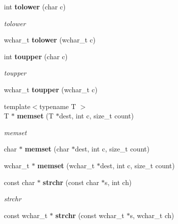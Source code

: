 \begin{DoxyCompactItemize}
\item 
int {\bf tolower} (char c)\label{namespacestring__util_abe4f0e0cc9d5260ee988dd629be5cf33}

\begin{DoxyCompactList}\small\item\em tolower \end{DoxyCompactList}\item 
wchar\+\_\+t {\bfseries tolower} (wchar\+\_\+t c)\label{namespacestring__util_a1a1472adfdc7d01583d9608ac28ffe43}

\item 
int {\bf toupper} (char c)\label{namespacestring__util_ad69a7a0bcec3adae0a307357922c324b}

\begin{DoxyCompactList}\small\item\em toupper \end{DoxyCompactList}\item 
wchar\+\_\+t {\bfseries toupper} (wchar\+\_\+t c)\label{namespacestring__util_a851103e5ef3d3ab575f8aa92d213fa42}

\item 
{\footnotesize template$<$typename T $>$ }\\T $\ast$ {\bf memset} (T $\ast$dest, int c, size\+\_\+t count)\label{namespacestring__util_a6ca68d7c6c61eaa4a378fdaa016f2e13}

\begin{DoxyCompactList}\small\item\em memset \end{DoxyCompactList}\item 
char $\ast$ {\bfseries memset} (char $\ast$dest, int c, size\+\_\+t count)\label{namespacestring__util_a4a6bd4ad0f654fff0a4ee630f1326640}

\item 
wchar\+\_\+t $\ast$ {\bfseries memset} (wchar\+\_\+t $\ast$dest, int c, size\+\_\+t count)\label{namespacestring__util_a860f9c92e013f2863060669bbe05973b}

\item 
const char $\ast$ {\bf strchr} (const char $\ast$s, int ch)\label{namespacestring__util_aa88a0930241b7add7546b649ebec855d}

\begin{DoxyCompactList}\small\item\em strchr \end{DoxyCompactList}\item 
const wchar\+\_\+t $\ast$ {\bfseries strchr} (const wchar\+\_\+t $\ast$s, wchar\+\_\+t ch)\label{namespacestring__util_a70588ea01a35282892b8f0c281a5bb1c}


\end{DoxyCompactItemize}

